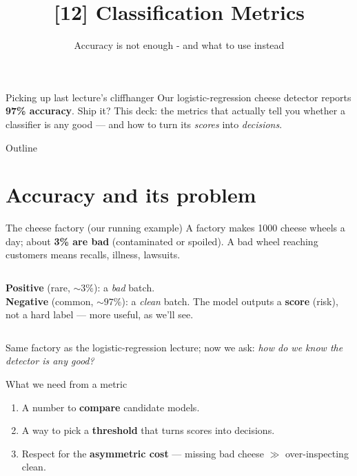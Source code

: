 \documentclass[aspectratio=169]{beamer}
\title{[12] Classification Metrics}
\subtitle{Accuracy is not enough - and what to use instead}
\date{}
\begin{document}
\begin{frame}{Picking up last lecture's cliffhanger}
  Our logistic-regression cheese detector reports \textbf{97\% accuracy}. Ship it?
  \vfill
  \vfill
  This deck: the metrics that actually tell you whether a classifier is any good --- and
  how to turn its \emph{scores} into \emph{decisions}.
\end{frame}

\begin{frame}{Outline}
  \tableofcontents
\end{frame}

\section{Accuracy and its problem}

\begin{frame}{The cheese factory (our running example)}
  A factory makes 1000 cheese wheels a day; about \textbf{3\% are bad} (contaminated or
  spoiled). A bad wheel reaching customers means recalls, illness, lawsuits.
  \vfill
  \begin{columns}[T]
    \textbf{Positive} (rare, $\sim 3\%$): a \emph{bad} batch.\\[2pt]
    \textbf{Negative} (common, $\sim 97\%$): a \emph{clean} batch.
    The model outputs a \textbf{score} (risk), not a hard label --- more useful, as we'll see.
  \end{columns}
  \vfill
  \footnotesize Same factory as the logistic-regression lecture; now we ask: \emph{how do we
  know the detector is any good?}
\end{frame}

\begin{frame}{What we need from a metric}
  \begin{enumerate}
    \item A number to \textbf{compare} candidate models.
    \item A way to pick a \textbf{threshold} that turns scores into decisions.
    \item Respect for the \textbf{asymmetric cost} --- missing bad cheese $\gg$ over-inspecting clean.
  \end{enumerate}
  \vfill
\end{frame}
\end{document}
